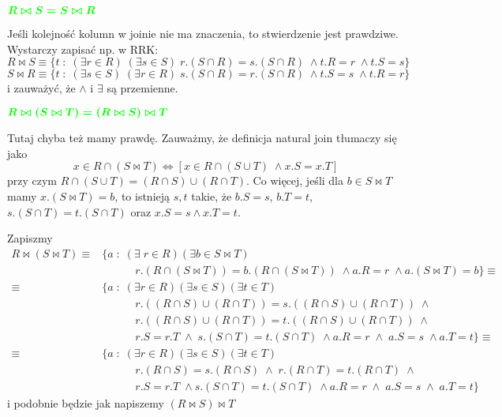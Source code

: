\documentclass{article}
\begin{document}
\begin{solution}
  $\boldsymbol{\color{green}R\bowtie S=S\bowtie R}$


  Jeśli kolejność kolumn w joinie nie ma znaczenia, to stwierdzenie jest prawdziwe. Wystarczy zapisać np. w RRK:
  $$R\bowtie S\equiv \{ t\;:\;(\exists r\in R)\;(\exists s\in S)\; r.(S\cap R)=s.(S\cap R)\;\land t.R=r\;\land t.S=s\}$$
  $$S\bowtie R\equiv \{ t\;:\;(\exists s\in S)\;(\exists r\in R)\; s.(S\cap R)=r.(S\cap R)\;\land t.S=s\;\land t.R=r\}$$
  i zauważyć, że $\land$ i $\exists$ są przemienne.

  $\boldsymbol{\color{green}R\bowtie(S\bowtie T)=(R\bowtie S)\bowtie T}$

  Tutaj chyba też mamy prawdę. Zauważmy, że definicja natural join tłumaczy się jako
  $$x\in R\cap (S\bowtie T)\iff [x\in R\cap (S\cup T)\;\land x.S=x.T]$$
  przy czym $R\cap (S\cup T)=(R\cap S)\cup (R\cap T)$. Co więcej, jeśli dla $b\in S\bowtie T$ mamy $x.(S\bowtie T)=b$, to istnieją $s, t$ takie, że $b.S=s$, $b.T=t$, $s.(S\cap T)=t.(S\cap T)$ oraz $x.S=s\land x.T=t$.

  Zapiszmy
  \begin{align*}
    R\bowtie(S\bowtie T)\equiv & \{a\;:\; (\exists\;r\in R)(\exists b\in S\bowtie T)\\ 
                               &\quad \quad \quad r.(R\cap (S\bowtie T))=b.(R\cap (S\bowtie T))\;\land a.R=r\;\land a.(S\bowtie T)=b\}\equiv\\
      \equiv&\{a\;:\;(\exists r\in R)(\exists s\in S)(\exists t\in T)\\ 
            &\quad \quad \quad r.((R\cap S)\cup (R\cap T))=s.((R\cap S)\cup (R\cap T))\;\land\\ 
            &\quad\quad\quad r.((R\cap S)\cup (R\cap T))=t.((R\cap S)\cup (R\cap T))\;\land \\ 
            &\quad\quad\quad r.S=r.T\;\land\;s.(S\cap T)=t.(S\cap T)\;\land a.R=r\;\land\; a.S=s\;\land a.T=t\}\equiv\\ 
        \equiv &\{a\;:\;(\exists r\in R)(\exists s\in S)(\exists t\in T)\\ 
               &\quad\quad\quad r.(R\cap S)=s.(R\cap S)\;\land\; r.(R\cap T)=t.(R\cap T)\;\land\\ 
               &\quad\quad\quad r.S=r.T\;\land s.(S\cap T)=t.(S\cap T)\;\land a.R=r\;\land\;a.S=s\;\land\; a.T=t
             \}
  \end{align*}
  i podobnie będzie jak napiszemy $(R\bowtie S)\bowtie T$


\end{solution}
\end{document}
